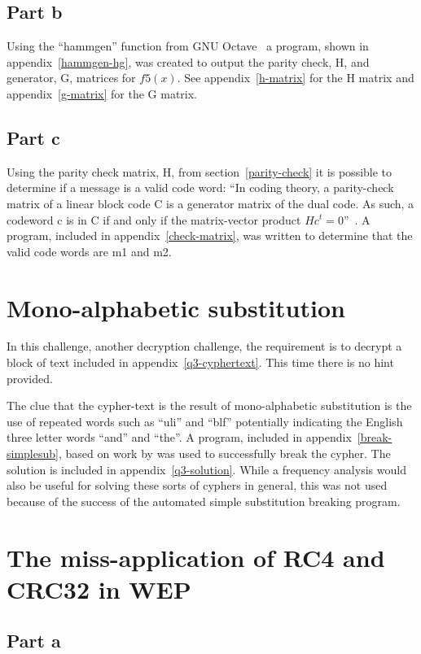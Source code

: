 \documentclass[pdftex, 12pt, a4paper]{article}
\begin{document}
\subsection{Part b}
Using the ``hammgen'' function from GNU Octave~\cite{hammgen-octave} a program,
shown in appendix~\ref{hammgen-hg}, was created to output the parity check,
H\label{parity-check}, and generator, G, matrices for $f5(x)$.
See appendix~\ref{h-matrix} for the H matrix and appendix~\ref{g-matrix} for the
G matrix.

\subsection{Part c}
Using the parity check matrix, H, from section~\ref{parity-check} it is possible
to determine if a message is a valid code word: ``In coding theory, a
parity-check matrix of a linear block code C is a generator matrix of the dual
code. As such, a codeword c is in C if and only if the matrix-vector product
$Hc^t = 0$''~\cite{check-matrix}. A program, included in
appendix~\ref{check-matrix}, was written to determine that the valid code words
are m1 and m2.

\section{Mono-alphabetic substitution}\label{mono}
In this challenge, another decryption challenge, the requirement is to decrypt a
block of text included in appendix~\ref{q3-cyphertext}. This time there is no
hint provided.

The clue that the cypher-text is the result of mono-alphabetic
substitution is the use of repeated words such as ``uli'' and ``blf''
potentially indicating the English three letter words ``and'' and ``the''.
A program, included in appendix~\ref{break-simplesub}, based on work by
\textcite{stochastic-searching} was used to successfully break the cypher.
The solution is included in appendix~\ref{q3-solution}.
While a frequency analysis would also be useful for solving these sorts of cyphers in
general, this was not used because of the success of the automated simple
substitution breaking program.

\section{The miss-application of RC4 and CRC32 in WEP}\label{conclusions}

\subsection{Part a}
\end{document}
